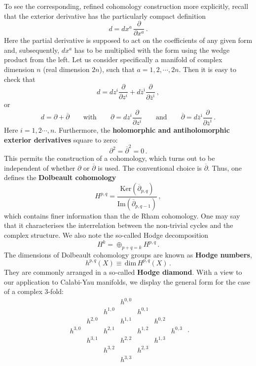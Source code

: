 \documentclass[12pt]{article}
\newcommand{\be}{\begin{equation}}
\newcommand{\ee}{\end{equation}}
\newcommand{\ol}{\overline}
\numberwithin{equation}{section}
\begin{document}
To see the corresponding, refined cohomology construction more explicitly, recall that the exterior derivative has the particularly compact definition
\be
d=dx^a\,\frac{\partial}{\partial x^a}\,.
\ee
Here the partial derivative is supposed to act on the coefficients of any given form and, subsequently, $dx^a$ has to be multiplied with the form using the wedge product from the left. Let us consider specifically a manifold of complex dimension $n$ (real dimension $2n$), such that $a=1,2,\cdots,2n$. Then it is easy to check that
\be
d=dz^i\frac{\partial}{\partial z^i}+d\ol{z}^{\ol{\imath}} \frac{\partial}{\partial \ol{z}^{\ol{\imath}}}\,,
\ee
or
\be
d=\partial+\ol{\partial}\qquad\mbox{with}\qquad \partial=dz^i\frac{\partial}{\partial z^i}\qquad\mbox{and}\qquad
\ol{\partial}=d\ol{z}^{\ol{\imath}} \frac{\partial}{\partial \ol{z}^{\ol{\imath}}}\,.
\ee
Here $i=1,2\cdots,n$. Furthermore, the {\bf holomorphic and antiholomorphic exterior derivatives} square to zero:
\be
\partial^2=\ol{\partial}^2=0\,.
\ee
This permits the construction of a cohomology, which turns out to be independent of whether $\partial$ or $\ol{\partial}$ is used. The conventional choice is $\ol{\partial}$. Thus, one defines the {\bf Dolbeault cohomology}
\be
H^{p,q}=\frac{\mbox{Ker}(\ol{\partial}_{p,q})}{\mbox{Im} (\ol{\partial}_{p,q-1})} \,,
\ee
which contains finer information than the de Rham cohomology. One may say that it characterises the interrelation between the non-trivial cycles and the complex structure. We also note the so-called Hodge decomposition
\be
H^k=\oplus_{p+q=k}H^{p,q}\,.
\ee
The dimensions of Dolbeault cohomology groups are known as {\bf Hodge numbers},
\be
h^{p,q}(X)\equiv\,\mbox{dim}\,H^{p,q}(X)\,.
\ee
They are commonly arranged in a so-called {\bf Hodge diamond}. With a view to our application to Calabi-Yau manifolds, we display the general form for the case of a complex 3-fold:
\be
\begin{array}{ccccccc}
&&&h^{0,0}&&& 
\\ 
&&h^{1,0}&&h^{0,1}&&
\\
&h^{2,0}&&h^{1,1}&&h^{0,2}&
\\
h^{3,0}&&h^{2,1}&&h^{1,2}&&h^{0,3}
\\
&h^{3,1}&&h^{2,2}&&h^{1,3}&
\\
&&h^{3,2}&&h^{2,3}&&
\\
&&&h^{3,3}&&& 
\end{array}\,\,.\label{ghd}
\ee
\end{document}
